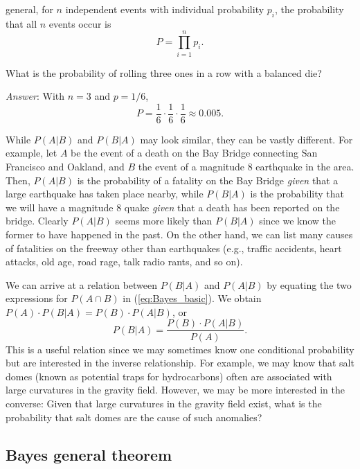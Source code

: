 general, for $n$ independent events with individual probability $p_i$, the probability that all $n$ events 
occur is
\begin{equation}
P = \prod ^n_{i=1} p_i.
\end{equation}
\begin{example}
What is the probability of rolling three ones in a row with a balanced die?

\emph{Answer}: With $n = 3$ and $p =1/6$,
\begin{equation}
P = \frac{1}{6} \cdot  \frac{1}{6} \cdot  \frac{1}{6} \approx 0.005.
\end{equation} 	 
\end{example}
While $P(A | B)$ and $P(B|A)$ may look similar, they can be vastly different.  For example, let $A$ be the event 
of a death on the Bay Bridge connecting San Francisco and Oakland, and $B$ the event of a magnitude 8 earthquake in the area.  
Then,  $P(A|B)$ is the probability of a fatality on the Bay Bridge \emph{given} that a large earthquake has 
taken place nearby, while $P(B|A)$ is the probability that we will have a magnitude 8 quake \emph{given} that a 
death has been reported on the bridge.  Clearly $P(A|B)$ seems more likely than $P(B|A)$ since we know the former to 
have happened in the past.  On the other hand, we can list many causes of fatalities on the freeway other than 
earthquakes (e.g., traffic accidents, heart attacks, old age, road rage, talk radio rants, and so on).

	We can arrive at a relation between $P(B|A)$ and $P(A|B)$ by equating the two expressions for $P(A\cap B)$ in 
(\ref{eq:Bayes_basic}).  We obtain $P(A) \cdot P (B|A) = P (B) \cdot P (A|B)$, or
\begin{equation}
P(B | A) = \frac{P(B) \cdot P (A | B)}{P(A)}.
\label{eq:relate_cond_prob}
\end{equation}
This is a useful relation since we may sometimes know one conditional probability but are 
interested in the inverse relationship.  For example, we may know that salt domes
(known as potential traps for hydrocarbons) often are associated with 
large curvatures in the gravity field.  However, we may be more interested in the converse: 
Given that large curvatures in the gravity field exist, what is the probability that salt domes are 
the cause of such anomalies?

\subsection{Bayes general theorem}

